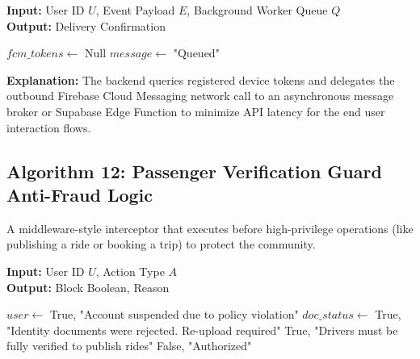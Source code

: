 \begin{algorithm}[H]
\caption{Asynchronous Push Notification Dispatch}
\textbf{Input:} User ID $U$, Event Payload $E$, Background Worker Queue $Q$ \\
\textbf{Output:} Delivery Confirmation
\begin{algorithmic}[1]
    \State $fcm\_tokens \gets$ 
        \State \Return Null
    \EndIf
    \State $message \gets$ 
    \State {} 
    \State \Return "Queued"
\EndFunction
\end{algorithmic}
\end{algorithm}

\textbf{Explanation:} The backend queries registered device tokens and delegates the outbound Firebase Cloud Messaging network call to an asynchronous message broker or Supabase Edge Function to minimize API latency for the end user interaction flows.

\subsection{Algorithm 12: Passenger Verification Guard Anti-Fraud Logic}

A middleware-style interceptor that executes before high-privilege operations (like publishing a ride or booking a trip) to protect the community.

\begin{algorithm}[H]
\small
\caption{Identity Verification Guard and Anti-Fraud Check}
\textbf{Input:} User ID $U$, Action Type $A$ \\
\textbf{Output:} Block Boolean, Reason
\begin{algorithmic}[1]
    \State $user \gets$ 
        \State \Return True, "Account suspended due to policy violation"
    \EndIf
    \State $doc\_status \gets$ 
        \State \Return True, "Identity documents were rejected. Re-upload required"
    \EndIf
        \State \Return True, "Drivers must be fully verified to publish rides"
    \EndIf
    \State \Return False, "Authorized"
\EndFunction
\end{algorithmic}
\end{algorithm}

